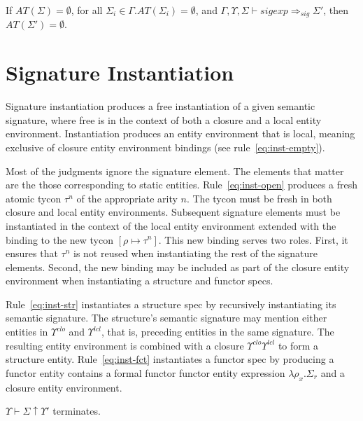 \begin{lemma}
If $AT(\Sigma) = \emptyset$, for all $\Sigma_i\in\Gamma.AT(\Sigma_i)=\emptyset$, and $\Gamma,\Upsilon,\Sigma\vdash sigexp \Rightarrow_{sig} \Sigma'$, then $AT(\Sigma') = \emptyset$. 
\end{lemma}

\section{Signature Instantiation}\label{sec:siginst}



Signature instantiation produces a free instantiation of a given
semantic signature, where free is in the context of both a closure and
a local entity environment. Instantiation produces an entity
environment that is local, meaning exclusive of closure entity
environment bindings (see rule~\ref{eq:inst-empty}). 

Most of the
judgments ignore the signature element. The elements that matter are
the those corresponding to static entities. Rule~\ref{eq:inst-open}
produces a fresh atomic tycon $\tau^n$ of the appropriate arity
$n$. The tycon must be fresh in both closure and local entity
environments. Subsequent signature elements must be instantiated in
the context of the local entity environment extended with the binding
to the new tycon $[\rho\mapsto\tau^n]$. This new binding serves two
roles. First, it ensures that $\tau^n$ is not reused when
instantiating the rest of the signature elements. Second, the new
binding may be included as part of the closure entity environment when
instantiating a structure and functor specs.  

Rule~\ref{eq:inst-str} instantiates a structure spec by recursively
instantiating its semantic signature. The structure's semantic signature may mention
either entities in $\Upsilon^{clo}$ and $\Upsilon^{lcl}$, that is,
preceding entities in the same signature. The resulting entity environment
is combined with a closure $\Upsilon^{clo}\Upsilon^{lcl}$ to form a
structure entity. Rule~\ref{eq:inst-fct} instantiates a functor spec
by producing a functor entity contains a formal functor functor entity
expression $\lambda\rho_x.\Sigma_r$ and a closure entity
environment. 

\begin{lemma}
$\Upsilon\vdash \Sigma \uparrow \Upsilon'$ terminates.
\end{lemma}

